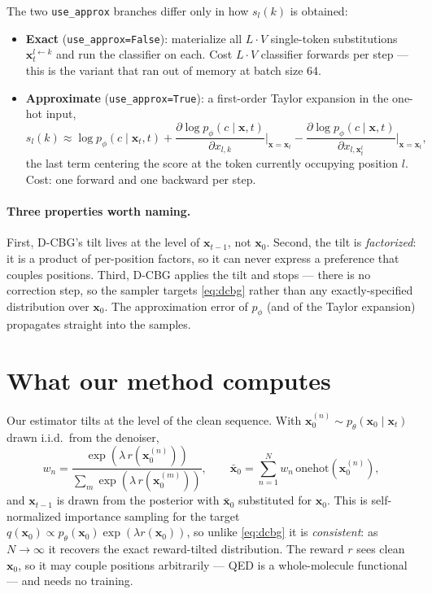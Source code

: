 \documentclass[11pt]{article}
\newcommand{\x}{\mathbf{x}}
\newcommand{\onehot}{\mathrm{onehot}}
\begin{document}
The two \texttt{use\_approx} branches differ only in how $s_l(k)$ is obtained:
\begin{itemize}
  \item \textbf{Exact} (\texttt{use\_approx=False}): materialize all $L \cdot V$
        single-token substitutions $\x_t^{l \leftarrow k}$ and run the
        classifier on each. Cost $L \cdot V$ classifier forwards per step ---
        this is the variant that ran out of memory at batch size 64.
  \item \textbf{Approximate} (\texttt{use\_approx=True}): a first-order Taylor
        expansion in the one-hot input,
        \begin{equation}
        s_l(k) \approx \log p_\phi(c \mid \x_t, t)
          + \frac{\partial \log p_\phi(c \mid \x, t)}{\partial x_{l,k}}
            \bigg|_{\x = \x_t}
          - \frac{\partial \log p_\phi(c \mid \x, t)}{\partial x_{l, \x_t^l}}
            \bigg|_{\x = \x_t},
        \end{equation}
        the last term centering the score at the token currently occupying
        position $l$. Cost: one forward and one backward per step.
\end{itemize}

\paragraph{Three properties worth naming.}
First, D-CBG's tilt lives at the level of $\x_{t-1}$, not $\x_0$. Second, the
tilt is \emph{factorized}: it is a product of per-position factors, so it can
never express a preference that couples positions. Third, D-CBG applies the
tilt and stops --- there is no correction step, so the sampler targets
\eqref{eq:dcbg} rather than any exactly-specified distribution over $\x_0$. The
approximation error of $p_\phi$ (and of the Taylor expansion) propagates
straight into the samples.

\section{What our method computes}

Our estimator tilts at the level of the clean sequence. With
$\x_0^{(n)} \sim p_\theta(\x_0 \mid \x_t)$ drawn i.i.d.\ from the denoiser,
\begin{equation}
w_n = \frac{\exp(\lambda\, r(\x_0^{(n)}))}
           {\sum_{m} \exp(\lambda\, r(\x_0^{(m)}))},
\qquad
\bar{\x}_0 = \sum_{n=1}^{N} w_n \, \onehot(\x_0^{(n)}),
\end{equation}
and $\x_{t-1}$ is drawn from the posterior with $\bar{\x}_0$ substituted for
$\x_0$. This is self-normalized importance sampling for the target
$q(\x_0) \propto p_\theta(\x_0)\exp(\lambda r(\x_0))$, so unlike \eqref{eq:dcbg}
it is \emph{consistent}: as $N \to \infty$ it recovers the exact reward-tilted
distribution. The reward $r$ sees clean $\x_0$, so it may couple positions
arbitrarily --- QED is a whole-molecule functional --- and needs no training.
\end{document}

